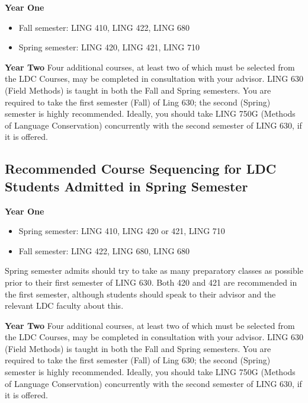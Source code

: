 \documentclass[
]{book}
\providecommand{\tightlist}{%
  \setlength{\itemsep}{0pt}\setlength{\parskip}{0pt}}
\begin{document}
\textbf{Year One}

\begin{itemize}
\tightlist
\item
  Fall semester: LING 410, LING 422, LING 680
\item
  Spring semester: LING 420, LING 421, LING 710
\end{itemize}

\textbf{Year Two}
Four additional courses, at least two of which must be selected from the LDC Courses, may be completed in consultation with your advisor. LING 630 (Field Methods) is taught in both the Fall and Spring semesters. You are required to take the first semester (Fall) of Ling 630; the second (Spring) semester is highly recommended. Ideally, you should take LING 750G (Methods of Language Conservation) concurrently with the second semester of LING 630, if it is offered.

\hypertarget{recommended-course-sequencing-for-ldc-students-admitted-in-spring-semester}{%
\subsection{Recommended Course Sequencing for LDC Students Admitted in Spring Semester}\label{recommended-course-sequencing-for-ldc-students-admitted-in-spring-semester}}

\textbf{Year One}

\begin{itemize}
\tightlist
\item
  Spring semester: LING 410, LING 420 or 421, LING 710
\item
  Fall semester: LING 422, LING 680, LING 680
\end{itemize}

Spring semester admits should try to take as many preparatory classes as possible prior to their first semester of LING 630. Both 420 and 421 are recommended in the first semester, although students should speak to their advisor and the relevant LDC faculty about this.

\textbf{Year Two}
Four additional courses, at least two of which must be selected from the LDC Courses, may be completed in consultation with your advisor. LING 630 (Field Methods) is taught in both the Fall and Spring semesters. You are required to take the first semester (Fall) of Ling 630; the second (Spring) semester is highly recommended. Ideally, you should take LING 750G (Methods of Language Conservation) concurrently with the second semester of LING 630, if it is offered.
\end{document}
